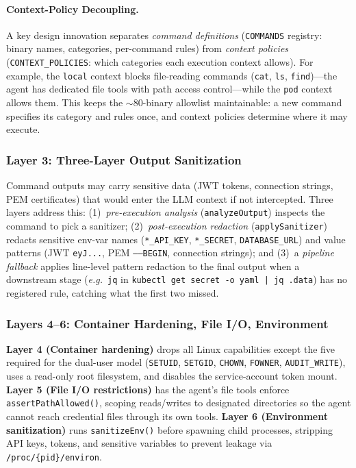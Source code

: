 \documentclass[letterpaper]{article}
\newcommand{\eg}{\textit{e.g.}}
\begin{document}
\paragraph{Context-Policy Decoupling.}
A key design innovation separates \emph{command definitions} (\texttt{COMMANDS} registry: binary names, categories, per-command rules) from \emph{context policies} (\texttt{CONTEXT\_POLICIES}: which categories each execution context allows). For example, the \texttt{local} context blocks file-reading commands (\texttt{cat}, \texttt{ls}, \texttt{find})---the agent has dedicated file tools with path access control---while the \texttt{pod} context allows them. This keeps the $\sim$80-binary allowlist maintainable: a new command specifies its category and rules once, and context policies determine where it may execute.

\subsubsection{Layer 3: Three-Layer Output Sanitization}

Command outputs may carry sensitive data (JWT tokens, connection strings, PEM certificates) that would enter the LLM context if not intercepted. Three layers address this: (1)~\emph{pre-execution analysis} (\texttt{analyzeOutput}) inspects the command to pick a sanitizer; (2)~\emph{post-execution redaction} (\texttt{applySanitizer}) redacts sensitive env-var names (\texttt{*\_API\_KEY}, \texttt{*\_SECRET}, \texttt{DATABASE\_URL}) and value patterns (JWT \texttt{eyJ...}, PEM \texttt{-----BEGIN}, connection strings); and (3)~a \emph{pipeline fallback} applies line-level pattern redaction to the final output when a downstream stage (\eg\ \texttt{jq} in \texttt{kubectl get secret -o yaml | jq .data}) has no registered rule, catching what the first two missed.

\subsubsection{Layers 4--6: Container Hardening, File I/O, Environment}

\textbf{Layer 4 (Container hardening)} drops all Linux capabilities except the five required for the dual-user model (\texttt{SETUID}, \texttt{SETGID}, \texttt{CHOWN}, \texttt{FOWNER}, \texttt{AUDIT\_WRITE}), uses a read-only root filesystem, and disables the service-account token mount.
\textbf{Layer 5 (File I/O restrictions)} has the agent's file tools enforce \texttt{assertPathAllowed()}, scoping reads/writes to designated directories so the agent cannot reach credential files through its own tools.
\textbf{Layer 6 (Environment sanitization)} runs \texttt{sanitizeEnv()} before spawning child processes, stripping API keys, tokens, and sensitive variables to prevent leakage via \texttt{/proc/\{pid\}/environ}.
\end{document}
